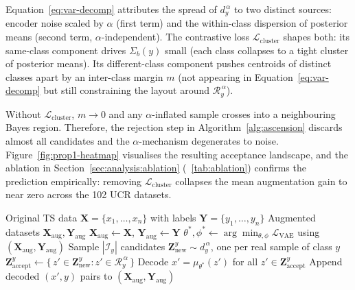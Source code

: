 Equation~\ref{eq:var-decomp} attributes the spread of
$d_y^{\,\alpha}$ to two distinct sources: encoder noise scaled
by $\alpha$ (first term) and the within-class dispersion of
posterior means (second term, $\alpha$-independent). The
contrastive loss $\mathcal{L}_{\text{cluster}}$ shapes both:
its same-class component drives $\Sigma_b(y)$ small (each class
collapses to a tight cluster of posterior means). Its
different-class component pushes centroids of distinct classes
apart by an inter-class margin $m$ (not appearing in Equation~\ref{eq:var-decomp} but still
constraining the layout around $\mathcal{R}_y^{\,\alpha}$).

Without $\mathcal{L}_{\text{cluster}}$, $m \to 0$ and any
$\alpha$-inflated sample crosses into a neighbouring Bayes region. Therefore,
the rejection step in Algorithm~\ref{alg:ascension} discards
almost all candidates and the $\alpha$-mechanism degenerates to
noise. Figure~\ref{fig:prop1-heatmap} visualises the resulting
acceptance landscape, and the ablation in
Section~\ref{sec:analysis:ablation} (\tablename~\ref{tab:ablation})
confirms the prediction empirically: removing
$\mathcal{L}_{\text{cluster}}$ collapses the mean augmentation
gain to near zero across the 102 UCR datasets.



\begin{algorithm}[H]
  \caption{ASCENSION augmentation loop}
  \label{alg:ascension}
  \begin{algorithmic}[1]
    \Require Original TS data
      $\mathbf{X} = \{x_1, \ldots, x_n\}$ with labels
      $\mathbf{Y} = \{y_1, \ldots, y_n\}$
    \Ensure Augmented datasets
      $\mathbf{X}_{\text{aug}}, \mathbf{Y}_{\text{aug}}$
    \State $\mathbf{X}_{\text{aug}} \gets \mathbf{X}$,\;
           $\mathbf{Y}_{\text{aug}} \gets \mathbf{Y}$
      \State $\theta^{*}, \phi^{*} \gets
              \arg\min_{\theta,\phi}
                \mathcal{L}_{\text{VAE}}$
                using $(\mathbf{X}_{\text{aug}}, \mathbf{Y}_{\text{aug}})$
        \State Sample $|\mathcal{I}_y|$ candidates
          $\mathbf{Z}_{\text{new}}^{y} \sim d_y^{\,\alpha}$,
          one per real sample of class $y$
        \State $\mathbf{Z}_{\text{accept}}^{y} \gets
          \{\,z' \in \mathbf{Z}_{\text{new}}^{y}
          : z' \in \mathcal{R}_y^{\,\alpha}\,\}$
        \State Decode
          $x' = \mu_{\theta^{*}}(z')$ for all
          $z' \in \mathbf{Z}_{\text{accept}}^{y}$
      \EndFor
      \State Append decoded $(x', y)$ pairs to
        $(\mathbf{X}_{\text{aug}}, \mathbf{Y}_{\text{aug}})$
    \EndWhile
  \end{algorithmic}
\end{algorithm}

